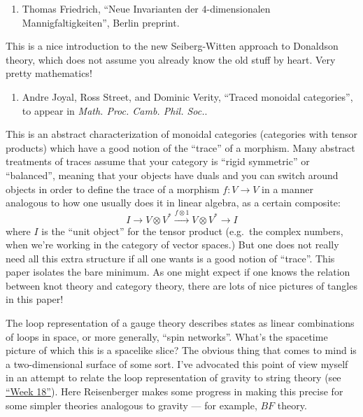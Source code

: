 \documentclass{article}
\def\tightlist{}
\renewcommand{\texttt}[1]{%
  \begingroup
  \ttfamily
  \begingroup\lccode`~=`/\lowercase{\endgroup\def~}{/\discretionary{}{}{}}%
  \begingroup\lccode`~=`[\lowercase{\endgroup\def~}{[\discretionary{}{}{}}%
  \begingroup\lccode`~=`.\lowercase{\endgroup\def~}{.\discretionary{}{}{}}%
  \catcode`/=\active\catcode`[=\active\catcode`.=\active
  \scantokens{#1\noexpand}%
  \endgroup
}
\begin{document}
\begin{enumerate}
\def\labelenumi{\arabic{enumi})}
\setcounter{enumi}{2}
\tightlist
\item
  Thomas Friedrich, ``Neue Invarianten der \(4\)-dimensionalen
  Mannigfaltigkeiten'', Berlin preprint.
\end{enumerate}

This is a nice introduction to the new Seiberg-Witten approach to
Donaldson theory, which does not assume you already know the old stuff
by heart. Very pretty mathematics!

\begin{enumerate}
\def\labelenumi{\arabic{enumi})}
\setcounter{enumi}{3}
\tightlist
\item
  Andre Joyal, Ross Street, and Dominic Verity, ``Traced monoidal
  categories'', to appear in \emph{Math. Proc. Camb. Phil. Soc.}.
\end{enumerate}

This is an abstract characterization of monoidal categories (categories
with tensor products) which have a good notion of the ``trace'' of a
morphism. Many abstract treatments of traces assume that your category
is ``rigid symmetric'' or ``balanced'', meaning that your objects have
duals and you can switch around objects in order to define the trace of
a morphism \(f\colon V \to V\) in a manner analogous to how one usually
does it in linear algebra, as a certain composite:
\[I\to V\otimes V^* \xrightarrow{f\otimes1}V\otimes V^*\to I\] where
\(I\) is the ``unit object'' for the tensor product (e.g.~the complex
numbers, when we're working in the category of vector spaces.) But one
does not really need all this extra structure if all one wants is a good
notion of ``trace''. This paper isolates the bare minimum. As one might
expect if one knows the relation between knot theory and category
theory, there are lots of nice pictures of tangles in this paper!


The loop representation of a gauge theory describes states as linear
combinations of loops in space, or more generally, ``spin networks''.
What's the spacetime picture of which this is a spacelike slice? The
obvious thing that comes to mind is a two-dimensional surface of some
sort. I've advocated this point of view myself in an attempt to relate
the loop representation of gravity to string theory (see
\protect\hyperlink{week18}{``Week 18''}). Here Reisenberger makes some
progress in making this precise for some simpler theories analogous to
gravity --- for example, \(BF\) theory.
\end{document}

